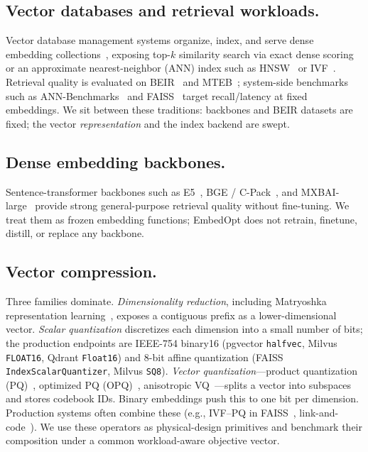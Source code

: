 \documentclass[sigconf]{acmart}
\newcommand{\method}{EmbedOpt}
\begin{document}
\subsection{Vector databases and retrieval workloads.}
Vector database management systems organize, index, and serve dense embedding collections~\cite{pan2024vectordb,zilliztech2021milvus,douze2024faiss}, exposing top-$k$ similarity search via exact dense scoring or an approximate nearest-neighbor (ANN) index such as HNSW~\cite{malkov2020hnsw} or IVF~\cite{baranchuk2018revisiting}. Retrieval quality is evaluated on BEIR~\cite{thakur2021beir} and MTEB~\cite{muennighoff2023mteb}; system-side benchmarks such as ANN-Benchmarks~\cite{aumuller2017annbenchmarks} and FAISS~\cite{douze2024faiss,johnson2019billion} target recall/latency at fixed embeddings. We sit between these traditions: backbones and BEIR datasets are fixed; the vector \emph{representation} and the index backend are swept.

\subsection{Dense embedding backbones.}
Sentence-transformer backbones such as E5~\cite{wang2022e5}, BGE / C-Pack~\cite{xiao2023cpack}, and MXBAI-large~\cite{mxbai2024embed} provide strong general-purpose retrieval quality without fine-tuning. We treat them as frozen embedding functions; \method{} does not retrain, finetune, distill, or replace any backbone.

\subsection{Vector compression.}
Three families dominate. \emph{Dimensionality reduction}, including Matryoshka representation learning~\cite{kusupati2022matryoshka}, exposes a contiguous prefix as a lower-dimensional vector. \emph{Scalar quantization} discretizes each dimension into a small number of bits; the production endpoints are IEEE-754 binary16 (pgvector \texttt{halfvec}, Milvus \texttt{FLOAT16}, Qdrant \texttt{Float16}) and 8-bit affine quantization (FAISS \texttt{IndexScalarQuantizer}, Milvus \texttt{SQ8}). \emph{Vector quantization}---product quantization (PQ)~\cite{jegou2011product}, optimized PQ (OPQ)~\cite{ge2014opq}, anisotropic VQ~\cite{guo2020faisspq}---splits a vector into subspaces and stores codebook IDs. Binary embeddings push this to one bit per dimension. Production systems often combine these (e.g., IVF--PQ in FAISS~\cite{douze2024faiss}, link-and-code~\cite{douze2019linkndcode}). We use these operators as physical-design primitives and benchmark their composition under a common workload-aware objective vector.
\end{document}

